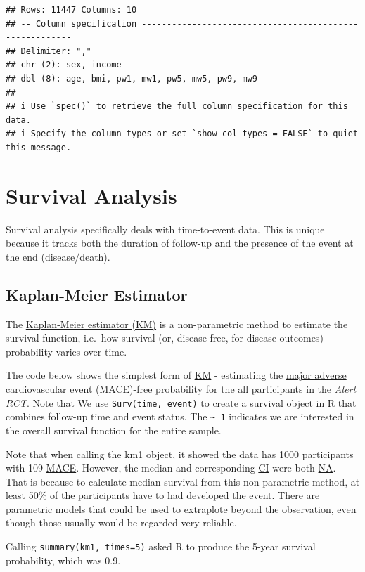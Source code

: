 \documentclass[
]{book}
\begin{document}
\begin{verbatim}
## Rows: 11447 Columns: 10
## -- Column specification --------------------------------------------------------
## Delimiter: ","
## chr (2): sex, income
## dbl (8): age, bmi, pw1, mw1, pw5, mw5, pw9, mw9
## 
## i Use `spec()` to retrieve the full column specification for this data.
## i Specify the column types or set `show_col_types = FALSE` to quiet this message.
\end{verbatim}

\section{Survival Analysis}\label{survival-analysis}

Survival analysis specifically deals with time-to-event data. This is unique because it tracks both the duration of follow-up and the presence of the event at the end (disease/death).

\subsection{Kaplan-Meier Estimator}\label{kaplan-meier-estimator}

The \hyperref[acronyms_KM]{Kaplan-Meier estimator (KM)} is a non-parametric method to estimate the survival function, i.e.~how survival (or, disease-free, for disease outcomes) probability varies over time.

The code below shows the simplest form of \hyperref[acronyms_KM]{KM} - estimating the \hyperref[acronyms_MACE]{major adverse cardiovascular event (MACE)}-free probability for the all participants in the \emph{Alert RCT}. Note that We use \texttt{Surv(time,\ event)} to create a survival object in R that combines follow-up time and event status. The \texttt{\textasciitilde{}\ 1} indicates we are interested in the overall survival function for the entire sample.

Note that when calling the km1 object, it showed the data has 1000 participants with 109 \hyperref[acronyms_MACE]{MACE}. However, the median and corresponding \hyperref[acronyms_CI]{CI} were both \hyperref[acronyms_NA]{NA}. That is because to calculate median survival from this non-parametric method, at least 50\% of the participants have to had developed the event. There are parametric models that could be used to extraplote beyond the observation, even though those usually would be regarded very reliable.

Calling \texttt{summary(km1,\ times=5)} asked R to produce the 5-year survival probability, which was 0.9.
\end{document}
